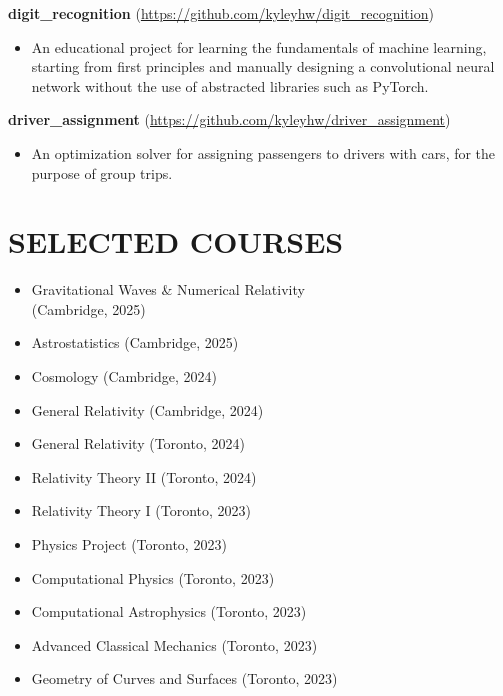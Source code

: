 \documentclass[a4paper,10pt]{extarticle}
\begin{document}
\textbf{digit\_recognition} (\url{https://github.com/kyleyhw/digit_recognition})
\begin{itemize}
    \item An educational project for learning the fundamentals of machine learning, starting from first principles and manually designing a convolutional neural network without the use of abstracted libraries such as PyTorch.
\end{itemize}

\textbf{driver\_assignment} (\url{https://github.com/kyleyhw/driver_assignment})
\begin{itemize}
    \item An optimization solver for assigning passengers to drivers with cars, for the purpose of group trips.
\end{itemize}

\section*{SELECTED COURSES}
\begin{multicols}{2}
\begin{itemize}
    \item Gravitational Waves \& Numerical Relativity \\(Cambridge, 2025)
    \item Astrostatistics (Cambridge, 2025)
    \item Cosmology (Cambridge, 2024)
    \item General Relativity (Cambridge, 2024)
    \item General Relativity (Toronto, 2024)
    \item Relativity Theory II (Toronto, 2024)
    \item Relativity Theory I (Toronto, 2023)
    \item Physics Project (Toronto, 2023)
    \item Computational Physics (Toronto, 2023)
    \item Computational Astrophysics (Toronto, 2023)
    \item Advanced Classical Mechanics (Toronto, 2023)
    \item Geometry of Curves and Surfaces (Toronto, 2023)
\end{itemize}
\end{multicols}

\newpage
\end{document}
